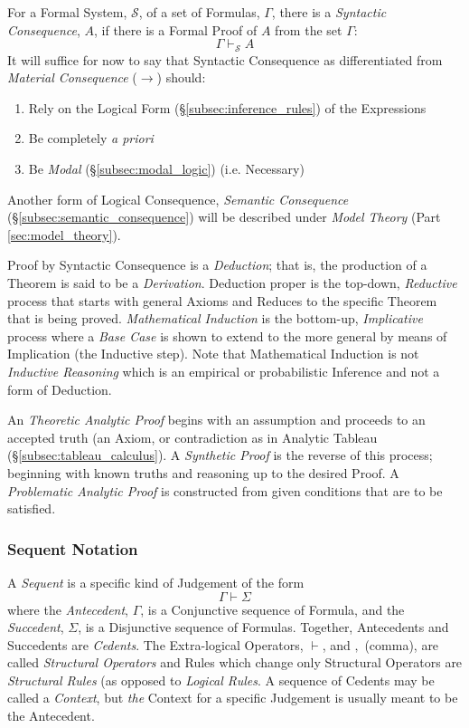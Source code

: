 \documentclass{article}
\begin{document}
For a Formal System, $\mathcal{S}$, of a set of Formulas, $\Gamma$,
there is a \emph{Syntactic Consequence}, $A$, if there is a
Formal Proof of $A$ from the set $\Gamma$:
\[
    \Gamma \vdash_{\mathcal{S}} A
\]
It will suffice for now to say that Syntactic Consequence as
differentiated from \emph{Material Consequence} ($\rightarrow$)
should:

\begin{enumerate}
\item Rely on the Logical Form (\S\ref{subsec:inference_rules}) of the
  Expressions
\item Be completely \emph{a priori}
\item Be \emph{Modal} (\S\ref{subsec:modal_logic}) (i.e. Necessary)
\end{enumerate}
Another form of Logical Consequence, \emph{Semantic Consequence}
(\S\ref{subsec:semantic_consequence}) will be described under
\emph{Model Theory} (Part \ref{sec:model_theory}).

Proof by Syntactic Consequence is a \emph{Deduction}; that is, the
production of a Theorem is said to be a \emph{Derivation}. Deduction
proper is the top-down, \emph{Reductive} process that starts with
general Axioms and Reduces to the specific Theorem that is being
proved. \emph{Mathematical Induction} is the bottom-up,
\emph{Implicative} process where a \emph{Base Case} is shown to extend
to the more general by means of Implication (the Inductive step). Note
that Mathematical Induction is not \emph{Inductive Reasoning} which is
an empirical or probabilistic Inference and not a form of Deduction.

An \emph{Theoretic Analytic Proof} begins with an assumption and
proceeds to an accepted truth (an Axiom, or contradiction as in
Analytic Tableau (\S\ref{subsec:tableau_calculus}). A \emph{Synthetic
  Proof} is the reverse of this process; beginning with known truths
and reasoning up to the desired Proof. A \emph{Problematic Analytic
  Proof} is constructed from given conditions that are to be
satisfied.

\subsubsection{Sequent Notation}\label{subsec:sequent_notation}

A \emph{Sequent} is a specific kind of Judgement of the form
\[\Gamma \vdash \Sigma \]
where the \emph{Antecedent}, $\Gamma$, is a Conjunctive sequence of
Formula, and the \emph{Succedent}, $\Sigma$, is a Disjunctive sequence
of Formulas. Together, Antecedents and Succedents are
\emph{Cedents}. The Extra-logical Operators, $\vdash$, and $,$
(comma), are called \emph{Structural Operators} and Rules which change
only Structural Operators are \emph{Structural Rules} (as opposed to
\emph{Logical Rules}. A sequence of Cedents may be called a
\emph{Context}, but \emph{the} Context for a specific Judgement is
usually meant to be the Antecedent.
\end{document}
